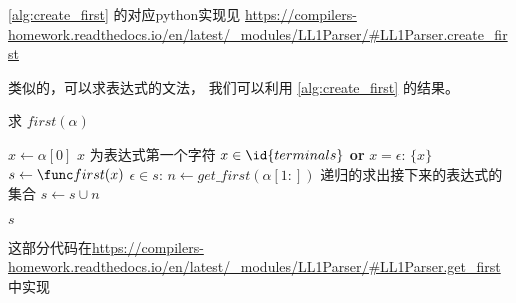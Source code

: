 \documentclass[../report]{subfiles}
\begin{document}
\cref{alg:create_first} 的对应python实现见
\url{https://compilers-homework.readthedocs.io/en/latest/_modules/LL1Parser/#LL1Parser.create_first}

类似的，可以求表达式的文法，
我们可以利用
\cref{alg:create_first}
的结果。


\begin{algorithm}[H]
  \caption{求 $first(\alpha)$}
  \begin{codebox}
      \li $x \gets \alpha[0]$ \Comment $x$ 为表达式第一个字符
      \li \If $x \in \id{terminals}$ \textbf{or} $x = \epsilon$:
      \Then
        \li \Return $\{ x \}$
      \End
      \li $s \gets \first(x)$
      \li \While $\epsilon \in s$:
      \Then
        \li $n \gets  get\_first(\alpha[1:])$
          \Comment 递归的求出接下来的表达式的\first 集合
        \li $s \gets s \cup n$
      \End

      \li \Return $s$ 
  \end{codebox}
  \label{alg:first}
\end{algorithm}

这部分代码在\url{https://compilers-homework.readthedocs.io/en/latest/_modules/LL1Parser/#LL1Parser.get_first}中实现
\end{document}
